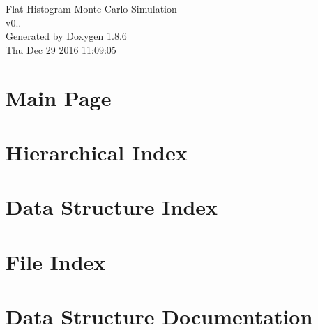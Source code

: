 \documentclass[twoside]{book}
\newcommand{\clearemptydoublepage}{%
  \newpage{\pagestyle{empty}\cleardoublepage}%
}
\begin{document}
\hypersetup{pageanchor=false}
\begin{titlepage}
\vspace*{7cm}
\begin{center}%
{\Large Flat-\/\-Histogram Monte Carlo Simulation \\[1ex]\large v0.. }\\
\vspace*{1cm}
{\large Generated by Doxygen 1.8.6}\\
\vspace*{0.5cm}
{\small Thu Dec 29 2016 11:09:05}\\
\end{center}
\end{titlepage}
\clearemptydoublepage
\tableofcontents
\clearemptydoublepage
{}
\hypersetup{pageanchor=true}

\chapter{Main Page}
\label{index}\hypertarget{index}{}
\chapter{Hierarchical Index}

\chapter{Data Structure Index}

\chapter{File Index}

\chapter{Data Structure Documentation}































\end{document}
